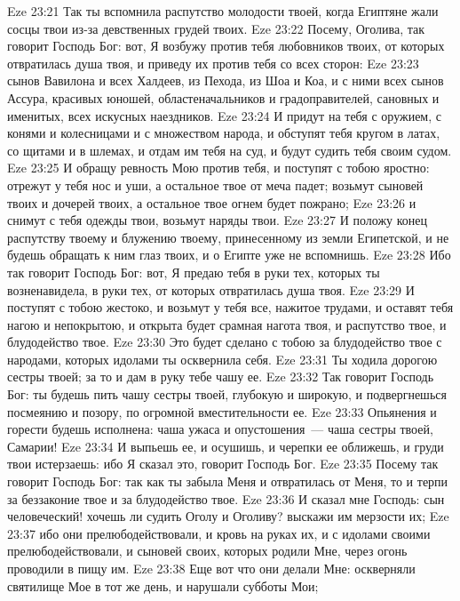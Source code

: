 \vs Eze 23:21 Так ты вспомнила распутство молодости твоей, когда Египтяне жали сосцы твои из-за девственных грудей твоих.
\vs Eze 23:22 Посему, Оголива, так говорит Господь Бог: вот, Я возбужу против тебя любовников твоих, от которых отвратилась душа твоя, и приведу их против тебя со всех сторон:
\vs Eze 23:23 сынов Вавилона и всех Халдеев, из Пехода, из Шоа и Коа, и с ними всех сынов Ассура, красивых юношей, областеначальников и градоправителей, сановных и именитых, всех искусных наездников.
\vs Eze 23:24 И придут на тебя с оружием, с конями и колесницами и с множеством народа, и обступят тебя кругом в латах, со щитами и в шлемах, и отдам им тебя на суд, и будут судить тебя своим судом.
\vs Eze 23:25 И обращу ревность Мою против тебя, и поступят с тобою яростно: отрежут у тебя нос и уши, а остальное твое от меча падет; возьмут сыновей твоих и дочерей твоих, а остальное твое огнем будет пожрано;
\vs Eze 23:26 и снимут с тебя одежды твои, возьмут наряды твои.
\vs Eze 23:27 И положу конец распутству твоему и блужению твоему, принесенному из земли Египетской, и не будешь обращать к ним глаз твоих, и о Египте уже не вспомнишь.
\vs Eze 23:28 Ибо так говорит Господь Бог: вот, Я предаю тебя в руки тех, которых ты возненавидела, в руки тех, от которых отвратилась душа твоя.
\vs Eze 23:29 И поступят с тобою жестоко, и возьмут у тебя все, нажитое трудами, и оставят тебя нагою и непокрытою, и открыта будет срамная нагота твоя, и распутство твое, и блудодейство твое.
\vs Eze 23:30 Это будет сделано с тобою за блудодейство твое с народами, которых идолами ты осквернила себя.
\vs Eze 23:31 Ты ходила дорогою сестры твоей; за то и дам в руку тебе чашу ее.
\vs Eze 23:32 Так говорит Господь Бог: ты будешь пить чашу сестры твоей, глубокую и широкую, и подвергнешься посмеянию и позору, по огромной вместительности ее.
\vs Eze 23:33 Опьянения и горести будешь исполнена: чаша ужаса и опустошения~--- чаша сестры твоей, Самарии!
\vs Eze 23:34 И выпьешь ее, и осушишь, и черепки ее оближешь, и груди твои истерзаешь: ибо Я сказал это, говорит Господь Бог.
\vs Eze 23:35 Посему так говорит Господь Бог: так как ты забыла Меня и отвратилась от Меня, то и терпи за беззаконие твое и за блудодейство твое.
\vs Eze 23:36 И сказал мне Господь: сын человеческий! хочешь ли судить Оголу и Оголиву? выскажи им мерзости их;
\vs Eze 23:37 ибо они прелюбодействовали, и кровь на руках их, и с идолами своими прелюбодействовали, и сыновей своих, которых родили Мне, через огонь проводили в пищу им.
\vs Eze 23:38 Еще вот что они делали Мне: оскверняли святилище Мое в тот же день, и нарушали субботы Мои;
